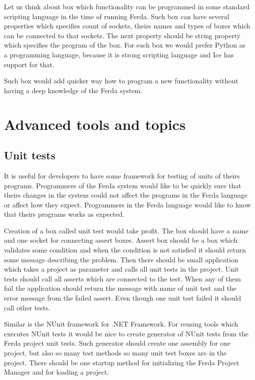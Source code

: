 \documentclass[a4paper,12pt]{book}
\begin{document}
Let us think about box which functionality can be programmed in some standard scripting language in the time of running Ferda. Such box can have several properties which specifies count of sockets, theirs names and types of boxes which can be connected to that sockets. The next property should be string property which specifies the program of the box. For such box we would prefer Python as a programming language, because it is strong scripting language and Ice has support for that.

Such box would add quicker way how to program a new functionality without having a deep knowledge of the Ferda system. 

\section{Advanced tools and topics}

\subsection{Unit tests}
It is useful for developers to have some framework for testing of units of theirs programs. Programmers of the Ferda system would like to be quickly sure that theirs changes in the system could not affect the programs in the Ferda language or affect how they expect. Programmers in the Ferda language would like to know that theirs programs works as expected.

Creation of a box called unit test would take profit. The box should have a name and one socket for connecting assert boxes. Assert box should be a box which validates some condition and when the condition is not satisfied it should return some message describing the problem. Then there should be small application which takes a project as parameter and calls all unit tests in the project. Unit tests should call all asserts which are connected to the test. When any of them fail the application should return the message with name of unit test and the error message from the failed assert. Even though one unit test failed it should call other tests.

Similar is the NUnit framework for .NET Framework. For reusing tools which executes NUnit tests it would be nice to create generator of NUnit tests from the Ferda project unit tests. Such generator should create one assembly for one project, but also so many test methods so many unit test boxes are in the project. There should be one startup method for initializing the Ferda Project Manager and for loading a project. 
\end{document}
